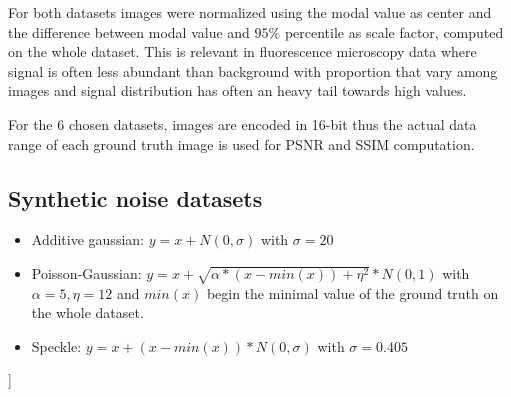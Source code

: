 \documentclass{article}
\begin{document}
For both datasets images were normalized using the modal value as center and the difference between modal value and $95\%$ percentile as scale factor, computed on the whole dataset.
This is relevant in fluorescence microscopy data where signal is often less abundant than background with proportion that vary among images and signal distribution has often an heavy tail towards high values.

For the 6 chosen datasets, images are encoded in 16-bit thus the actual data range of each ground truth image is used for PSNR and SSIM computation.

\subsection{Synthetic noise datasets}
\label{si:synthetic}
\begin{itemize}
  \item Additive gaussian: $y = x + N(0, \sigma)$ with $\sigma=20$
  \item Poisson-Gaussian: $y = x + \sqrt{\alpha * (x-min(x)) + \eta^2 }*N(0,1)$ with $\alpha=5, \eta=12$ and $min(x)$ begin the minimal value of the ground truth on the whole dataset.
  \item Speckle: $y = x + (x-min(x))*N(0,\sigma)$ with $\sigma=0.405$
\end{itemize}

{\small


}
] %
\end{document}

